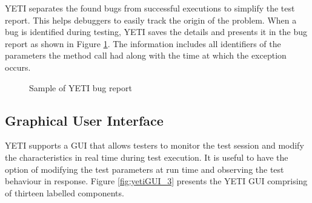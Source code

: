 YETI separates the found bugs from successful executions to simplify the test report. This helps debuggers to easily track the origin of the problem. When a bug is identified during testing, YETI saves the details and presents it in the bug report as shown in Figure \ref{bugReport}. The information includes all identifiers of the parameters the method call had along with the time at which the exception occurs.
\bigskip
\begin{figure}[H]
	\centering
	\smallskip
	\caption{Sample of YETI bug report}
	\label{bugReport}
\end{figure}

\subsection{Graphical User Interface}
YETI supports a GUI that allows testers to monitor the test session and modify the characteristics in real time during test execution. It is useful to have the option of modifying the test parameters at run time and observing the test behaviour in response. Figure \ref{fig:yetiGUI_3} presents the YETI GUI comprising of thirteen labelled components.


